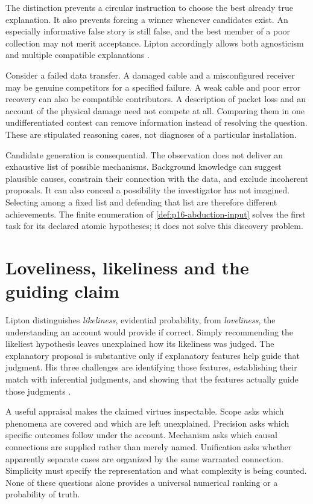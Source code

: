 The distinction prevents a circular instruction to choose the best already
true explanation. It also prevents forcing a winner whenever candidates
exist. An especially informative false story is still false, and the best
member of a poor collection may not merit acceptance. Lipton accordingly
allows both agnosticism and multiple compatible explanations
\cite[author copy pp.~5--7]{Lipton2000IBECompanion}.

Consider a failed data transfer. A damaged cable and a misconfigured
receiver may be genuine competitors for a specified failure. A weak cable
and poor error recovery can also be compatible contributors. A description
of packet loss and an account of the physical damage need not compete at
all. Comparing them in one undifferentiated contest can remove information
instead of resolving the question. These are stipulated reasoning cases,
not diagnoses of a particular installation.

Candidate generation is consequential. The observation does not deliver
an exhaustive list of possible mechanisms. Background knowledge can suggest
plausible causes, constrain their connection with the data, and exclude
incoherent proposals. It can also conceal a possibility the investigator
has not imagined. Selecting among a fixed list and defending that list
are therefore different achievements. The finite enumeration of
\cref{def:p16-abduction-input} solves the first task for its declared
atomic hypotheses; it does not solve this discovery problem.

\section{Loveliness, likeliness and the guiding claim}
\label{sec:p16-ibe-virtues}

Lipton distinguishes \emph{likeliness}, evidential probability, from
\emph{loveliness}, the understanding an account would provide if correct.
Simply recommending the likeliest hypothesis leaves unexplained how its
likeliness was judged. The explanatory proposal is substantive only if
explanatory features help guide that judgment. His three challenges are
identifying those features, establishing their match with inferential
judgments, and showing that the features actually guide those judgments
\cite[author copy pp.~5--9]{Lipton2000IBECompanion}.

A useful appraisal makes the claimed virtues inspectable. Scope asks which
phenomena are covered and which are left unexplained. Precision asks which
specific outcomes follow under the account. Mechanism asks which causal
connections are supplied rather than merely named. Unification asks whether
apparently separate cases are organized by the same warranted connection.
Simplicity must specify the representation and what complexity is being
counted. None of these questions alone provides a universal numerical
ranking or a probability of truth.

